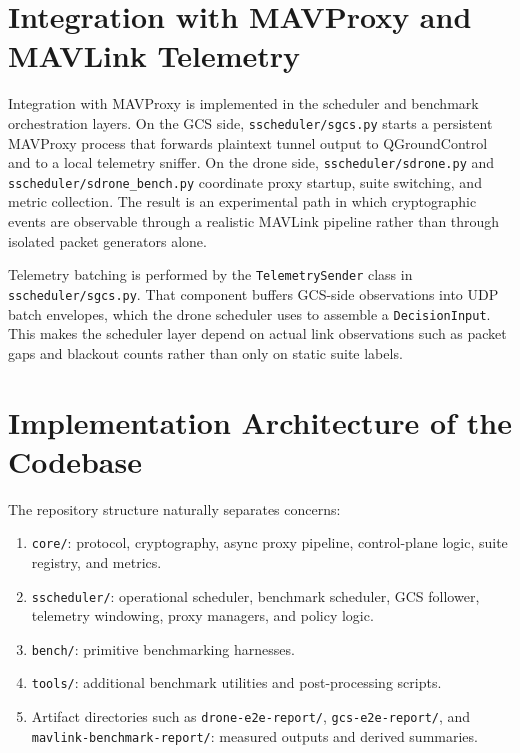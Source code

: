 \documentclass[11pt]{article}
\begin{document}
\section{Integration with MAVProxy and MAVLink Telemetry}
Integration with MAVProxy is implemented in the scheduler and benchmark orchestration layers. On the GCS side, \texttt{sscheduler/sgcs.py} starts a persistent MAVProxy process that forwards plaintext tunnel output to QGroundControl and to a local telemetry sniffer. On the drone side, \texttt{sscheduler/sdrone.py} and \texttt{sscheduler/sdrone\_bench.py} coordinate proxy startup, suite switching, and metric collection. The result is an experimental path in which cryptographic events are observable through a realistic MAVLink pipeline rather than through isolated packet generators alone.

Telemetry batching is performed by the \texttt{TelemetrySender} class in \texttt{sscheduler/sgcs.py}. That component buffers GCS-side observations into UDP batch envelopes, which the drone scheduler uses to assemble a \texttt{DecisionInput}. This makes the scheduler layer depend on actual link observations such as packet gaps and blackout counts rather than only on static suite labels.

\section{Implementation Architecture of the Codebase}
The repository structure naturally separates concerns:
\begin{enumerate}[leftmargin=*]
\item \texttt{core/}: protocol, cryptography, async proxy pipeline, control-plane logic, suite registry, and metrics.
\item \texttt{sscheduler/}: operational scheduler, benchmark scheduler, GCS follower, telemetry windowing, proxy managers, and policy logic.
\item \texttt{bench/}: primitive benchmarking harnesses.
\item \texttt{tools/}: additional benchmark utilities and post-processing scripts.
\item Artifact directories such as \texttt{drone-e2e-report/}, \texttt{gcs-e2e-report/}, and \texttt{mavlink-benchmark-report/}: measured outputs and derived summaries.
\end{enumerate}
\end{document}
